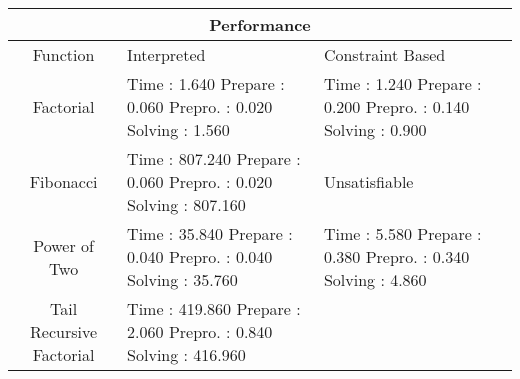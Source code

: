 \begin{table}[h!]
\centering
\begin{tabular}{|c|m{10em}|m{10em}|}
\hline
\multicolumn{3}{|c|}{\textbf{Performance}}\\
\hline
Function & Interpreted  & Constraint Based \\
\hline
Factorial 
& 
\mbox{}\newline
Time        : 1.640 \newline
  Prepare   : 0.060 \newline
  Prepro.   : 0.020 \newline
  Solving   : 1.560 \newline
& 
\mbox{}\newline
Time        : 1.240 \newline
  Prepare   : 0.200 \newline
  Prepro.   : 0.140 \newline
  Solving   : 0.900 \newline
\\
\hline
Fibonacci 
&
\mbox{}\newline 
Time        : 807.240 \newline
  Prepare   : 0.060 \newline
  Prepro.   : 0.020 \newline
  Solving   : 807.160 \newline
& 
Unsatisfiable
\\
\hline
Power of Two 
&
\mbox{}\newline 
Time        : 35.840 \newline
  Prepare   : 0.040 \newline
  Prepro.   : 0.040 \newline
  Solving   : 35.760 \newline
& 
\mbox{}\newline 
Time        : 5.580 \newline
  Prepare   : 0.380 \newline
  Prepro.   : 0.340 \newline
  Solving   : 4.860 \newline
\\
\hline
Tail Recursive Factorial
&
\mbox{}\newline 
Time        : 419.860 \newline
  Prepare   : 2.060 \newline
  Prepro.   : 0.840 \newline
  Solving   : 416.960 \newline
& 
\mbox{}\newline 

\end{tabular}
\end{table}
